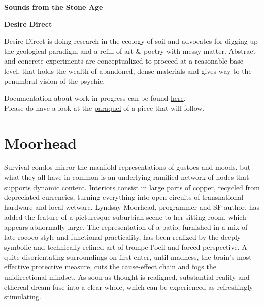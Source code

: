 \documentclass{article}
\begin{document}
\begin{titlepage}	%
\setcounter{page}{0}
	\Centering		
	{\Huge\bfseries Sounds from the Stone Age}
	
	\vspace{47pt} 
	{\Large\bfseries Desire Direct}

		 \vspace{85pt}
\justifying
\setlength{\parindent}{0pt}
Desire Direct is doing research in the ecology of soil 
	and advocates for digging up the geological paradigm 
and a refill of art \& poetry with messy matter. 
	Abstract and concrete experiments are conceptualized
to proceed at a reasonable base level, 
that holds the wealth of abandoned, dense materials 
and gives way to the penumbral vision of the psychic. 

	\vspace{11pt} 
	Documentation about work-in-progress can be found \href{https://desire-direct.github.io/}{here}.\\
	Please do have a look at the \href{https://desire-direct.com/the-vtex-files}{paraquel} of a piece that will follow.

	 \tableofcontents
	 \end{titlepage}

\section*{Moorhead}
Survival condos mirror the manifold representations of gustoes and moods, but what they all have in common is
an underlying ramified network of nodes that supports dynamic content.
Interiors consist in large parts of copper, recycled from depreciated currencies, turning everything into open circuits of transnational hardware and local wetware.
Lyndsay Moorhead, programmer and SF author,
has added the feature of a picturesque suburbian scene to her sitting-room,
which appears abnormally large.
The representation of a patio,
furnished in a mix of late rococo style and functional practicality,
has been realized by the deeply symbolic and
technically refined art of trompe-l'oeil and forced perspective.
A quite disorientating surroundings on first enter,
until madness, the brain's most effective
protective measure, cuts the cause-effect chain
and fogs the unidirectional mindset.
As soon as thought is realigned, 
substantial reality and ethereal dream
fuse into a clear whole, 
which can be experienced as refreshingly stimulating.
\end{document}
